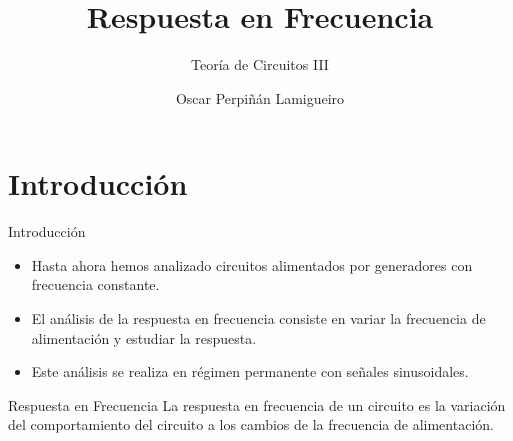 \documentclass[aspectratio=169, usenames,svgnames,dvipsnames]{beamer}
\author{Oscar Perpiñán Lamigueiro}
\date{}
\title{Respuesta en Frecuencia}
\subtitle{Teoría de Circuitos III}
\begin{document}
\maketitle

\section{Introducción}
\label{sec:orge030ef6}
\begin{frame}[label={sec:org6aa1d91}]{Introducción}
\begin{itemize}
\item Hasta ahora hemos analizado circuitos alimentados por generadores con frecuencia constante.
\item El análisis de la \alert{respuesta en frecuencia} consiste en variar la frecuencia de alimentación y estudiar la respuesta.
\item Este análisis se realiza en \alert{régimen permanente} con señales sinusoidales.
\end{itemize}

\begin{block}{Respuesta en Frecuencia}
La respuesta en frecuencia de un circuito es la variación del comportamiento del circuito a los cambios de la frecuencia de alimentación.
\end{block}
\end{frame}
\end{document}
